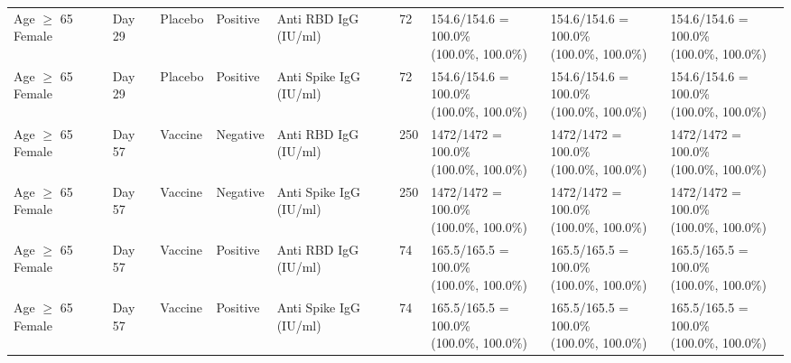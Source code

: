 \documentclass[]{book}
\theoremstyle{definition}
\theoremstyle{definition}
\theoremstyle{definition}
\newcommand{\1}{\mathbbm{1}}
\begin{document}
\begin{landscape}
\begin{ThreePartTable}
\begin{longtable}[t]{>{\raggedright\arraybackslash}p{2.7cm}llllllll}
\hspace{1em}Age $\geq$ 65 Female & Day 29 & Placebo & Positive & Anti RBD IgG (IU/ml) & 72 & \makecell[l]{154.6/154.6 = 100.0\%\\(100.0\%, 100.0\%)} & \makecell[l]{154.6/154.6 = 100.0\%\\(100.0\%, 100.0\%)} & \makecell[l]{154.6/154.6 = 100.0\%\\(100.0\%, 100.0\%)}\\
\hspace{1em}Age $\geq$ 65 Female & Day 29 & Placebo & Positive & Anti Spike IgG (IU/ml) & 72 & \makecell[l]{154.6/154.6 = 100.0\%\\(100.0\%, 100.0\%)} & \makecell[l]{154.6/154.6 = 100.0\%\\(100.0\%, 100.0\%)} & \makecell[l]{154.6/154.6 = 100.0\%\\(100.0\%, 100.0\%)}\\
\hspace{1em}Age $\geq$ 65 Female & Day 57 & Vaccine & Negative & Anti RBD IgG (IU/ml) & 250 & \makecell[l]{1472/1472 = 100.0\%\\(100.0\%, 100.0\%)} & \makecell[l]{1472/1472 = 100.0\%\\(100.0\%, 100.0\%)} & \makecell[l]{1472/1472 = 100.0\%\\(100.0\%, 100.0\%)}\\
\hspace{1em}Age $\geq$ 65 Female & Day 57 & Vaccine & Negative & Anti Spike IgG (IU/ml) & 250 & \makecell[l]{1472/1472 = 100.0\%\\(100.0\%, 100.0\%)} & \makecell[l]{1472/1472 = 100.0\%\\(100.0\%, 100.0\%)} & \makecell[l]{1472/1472 = 100.0\%\\(100.0\%, 100.0\%)}\\
\hspace{1em}Age $\geq$ 65 Female & Day 57 & Vaccine & Positive & Anti RBD IgG (IU/ml) & 74 & \makecell[l]{165.5/165.5 = 100.0\%\\(100.0\%, 100.0\%)} & \makecell[l]{165.5/165.5 = 100.0\%\\(100.0\%, 100.0\%)} & \makecell[l]{165.5/165.5 = 100.0\%\\(100.0\%, 100.0\%)}\\
\hspace{1em}Age $\geq$ 65 Female & Day 57 & Vaccine & Positive & Anti Spike IgG (IU/ml) & 74 & \makecell[l]{165.5/165.5 = 100.0\%\\(100.0\%, 100.0\%)} & \makecell[l]{165.5/165.5 = 100.0\%\\(100.0\%, 100.0\%)} & \makecell[l]{165.5/165.5 = 100.0\%\\(100.0\%, 100.0\%)}\\

\end{longtable}
\end{ThreePartTable}
\end{landscape}
\end{document}
